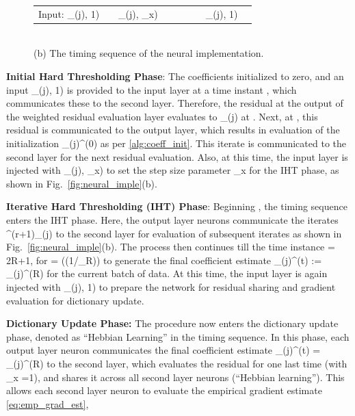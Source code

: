 \documentclass{article}
\def\[#1\]{{$#1$}}
\def\b#1{{\mathbf{#1}}}
\begin{document}
\begin{figure}[!t]
\begin{threeparttable}
{\begin{minipage}{0.98\textwidth}
{{\begin{tabular}{lccccccc|m{1.5cm}}
	\hspace{-0.15in}Input: \[(\b{y}_{(j)}, 1)\]&\[.\]&\[(\b{y}_{(j)}, \eta_x)\]&\hspace{-0.1in}\[.\]&\[.\]&\[.\]&\[\dots\]&\[(\b{y}_{(j)}, 1)\]& \hspace{-0.1in}
\end{tabular}}}
\end{minipage}}



\end{threeparttable}\\
{\footnotesize (b) The timing sequence of the neural implementation.}
\vspace{-5pt}
\end{figure}

\noindent\textbf{Initial Hard Thresholding Phase}: The coefficients initialized to zero, and an input \[(\b{y}_{(j)}, 1)\] is provided to the input layer at a time instant \[\ell=0\], which communicates these to the second layer. Therefore, the residual at the output of the weighted residual evaluation layer evaluates to \[\b{y}_{(j)}\] at \[\ell=1\]. Next, at \[\ell=2\], this residual is communicated to the output layer, which results in evaluation of the initialization \[ \b{x}_{(j)}^{(0)}\] as per \eqref{alg:coeff_init}. This iterate is communicated to the second layer for the next residual evaluation. Also, at this time, the input layer is injected with  \[(\b{y}_{(j)}, \eta_x)\] to set the step size parameter \[\eta_x\] for the IHT phase, as shown in Fig.~\ref{fig:neural_imple}(b). 

\noindent\textbf{Iterative Hard Thresholding (IHT) Phase}: Beginning \[\ell =3\], the timing sequence enters the IHT phase. Here, the output layer neurons communicate the iterates \[\b{x}^{(r+1)}_{(j)}\] to the second layer for evaluation of subsequent iterates as shown in Fig.~\ref{fig:neural_imple}(b). The process then continues till the time instance \[\ell = 2R+1\], for \[{R} = \Omega(\log(1/\delta_{R}))\] to generate the final coefficient estimate \[ \widehat{\b{x}}_{(j)}^{(t)} := \b{x}_{(j)}^{(R)} \] for the current batch of data. At this time, the input layer is again injected with \[(\b{y}_{(j)}, 1)\] to prepare the network for residual sharing and gradient evaluation for dictionary update.

\noindent\textbf{Dictionary Update Phase:} The procedure now enters the dictionary update phase, denoted as ``Hebbian Learning'' in the timing sequence. In this phase, each output layer neuron communicates the final coefficient estimate \[ \widehat{\b{x}}_{(j)}^{(t)} = \b{x}_{(j)}^{(R)} \] to the second layer, which evaluates the residual for one last time (with \[\eta_x =1\]), and shares it across all second layer neurons (``Hebbian learning''). This allows each second layer neuron to evaluate the empirical gradient estimate \eqref{eq:emp_grad_est},
\end{document}
